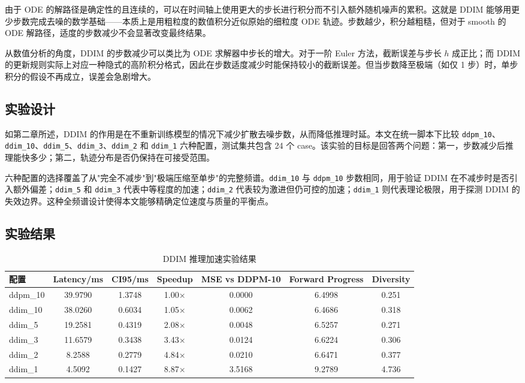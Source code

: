 由于 ODE 的解路径是确定性的且连续的，可以在时间轴上使用更大的步长进行积分而不引入额外随机噪声的累积。这就是 DDIM 能够用更少步数完成去噪的数学基础——本质上是用粗粒度的数值积分近似原始的细粒度 ODE 轨迹。步数越少，积分越粗糙，但对于 smooth 的 ODE 解路径，适度的步数减少不会显著改变最终结果。

从数值分析的角度，DDIM 的步数减少可以类比为 ODE 求解器中步长的增大。对于一阶 Euler 方法，截断误差与步长 $h$ 成正比；而 DDIM 的更新规则实际上对应一种隐式的高阶积分格式，因此在步数适度减少时能保持较小的截断误差。但当步数降至极端（如仅 1 步）时，单步积分的假设不再成立，误差会急剧增大。

\subsection{实验设计}

如第二章所述，DDIM 的作用是在不重新训练模型的情况下减少扩散去噪步数，从而降低推理时延\cite{ddim2020}。本文在统一脚本下比较 \texttt{ddpm\_10}、\texttt{ddim\_10}、\texttt{ddim\_5}、\texttt{ddim\_3}、\texttt{ddim\_2} 和 \texttt{ddim\_1} 六种配置，测试集共包含 24 个 case。该实验的目标是回答两个问题：第一，步数减少后推理能快多少；第二，轨迹分布是否仍保持在可接受范围。

六种配置的选择覆盖了从"完全不减步"到"极端压缩至单步"的完整频谱。\texttt{ddim\_10} 与 \texttt{ddpm\_10} 步数相同，用于验证 DDIM 在不减步时是否引入额外偏差；\texttt{ddim\_5} 和 \texttt{ddim\_3} 代表中等程度的加速；\texttt{ddim\_2} 代表较为激进但仍可控的加速；\texttt{ddim\_1} 则代表理论极限，用于探测 DDIM 的失效边界。这种全频谱设计使得本文能够精确定位速度与质量的平衡点。

\subsection{实验结果}

\begin{table}[htbp]
    \centering
    \caption{DDIM 推理加速实验结果}
    \label{tab:ddim-results}
    \begin{tabular}{lcccccc}
        \toprule
        配置 & Latency/ms & CI95/ms & Speedup & MSE vs DDPM-10 & Forward Progress & Diversity \\
        \midrule
        ddpm\_10 & 39.9790 & 1.3748 & 1.00$\times$ & 0.0000 & 6.4998 & 0.251 \\
        ddim\_10 & 38.0260 & 0.6034 & 1.05$\times$ & 0.0062 & 6.4686 & 0.318 \\
        ddim\_5 & 19.2581 & 0.4319 & 2.08$\times$ & 0.0048 & 6.5257 & 0.271 \\
        ddim\_3 & 11.6579 & 0.3438 & 3.43$\times$ & 0.0124 & 6.6224 & 0.306 \\
        ddim\_2 & 8.2588 & 0.2779 & 4.84$\times$ & 0.0210 & 6.6471 & 0.377 \\
        ddim\_1 & 4.5092 & 0.1427 & 8.87$\times$ & 3.5168 & 9.2789 & 4.736 \\
        \bottomrule
    \end{tabular}
\end{table}

